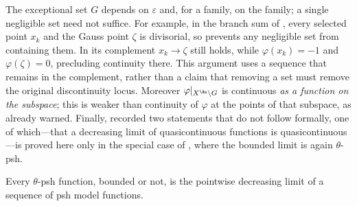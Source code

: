 \begin{remark}
\label{rem:ch25-qc-not}
The exceptional set $G$ depends on $\varepsilon$ and, for a family, on
the family; a single negligible set need not suffice.  For example, in the branch
sum of , every selected point $x_k$ and
the Gauss point $\zeta$ is divisorial, so
 prevents any negligible set from
containing them.  In its complement $x_k\to\zeta$ still holds, while
$\varphi(x_k)=-1$ and $\varphi(\zeta)=0$, precluding continuity there.
This argument uses a sequence that remains in the complement, rather than
a claim that removing a set must remove the original discontinuity locus.
Moreover
$\varphi|_{X^{\An}\setminus G}$ is continuous \emph{as a function on the
subspace}; this is weaker than continuity of $\varphi$ at the points of
that subspace, as  already warned.  Finally,
 recorded two statements that do not follow
formally, one of which---that a decreasing limit of quasicontinuous
functions is quasicontinuous---is proved here only in the special case of
, where the bounded limit is again
$\theta$-psh.
\end{remark}

\begin{corollary}
\label{cor:psh-sequential-regularization}
Every $\theta$-psh function, bounded or not, is the pointwise decreasing
limit of a sequence of psh model functions.
\end{corollary}

